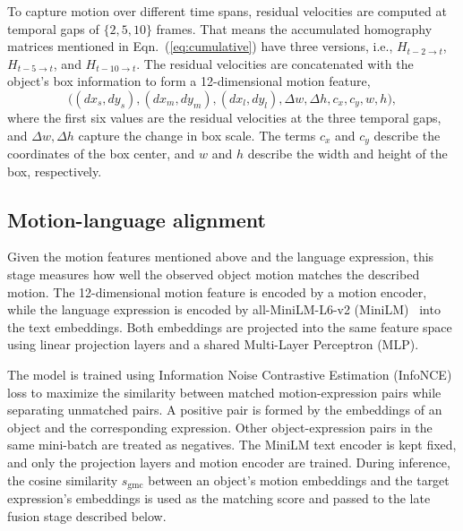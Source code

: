 \documentclass{article}
\begin{document}
To capture motion over different time spans, residual velocities are computed at temporal gaps of $\{2,5,10\}$ frames. That means the accumulated homography matrices mentioned in Eqn.~(\ref{eq:cumulative}) have three versions, i.e., $H_{t-2 \to t}$, $H_{t-5 \to t}$, and $H_{t-10 \to t}$. The residual velocities are concatenated with the object's box information to form a 12-dimensional motion feature,
\begin{equation}
  \bigl((dx_s,dy_s),(dx_m,dy_m),(dx_l,dy_l),\Delta w,\Delta h,c_x,c_y,w,h\bigr),
  \label{eq:descriptor}
\end{equation}
where the first six values are the residual velocities at the three temporal gaps, and $\Delta w, \Delta h$ capture the change in box scale. The terms $c_x$ and $c_y$ describe the coordinates of the box center, and $w$ and $h$ describe the width and height of the box, respectively.

\subsection{Motion-language alignment}
\label{sec:align}
Given the motion features mentioned above and the language expression, this stage measures how well the observed object motion matches the described motion. The 12-dimensional motion feature is encoded by a motion encoder, while the language expression is encoded by all-MiniLM-L6-v2 (MiniLM)~\cite{sbert} into the text embeddings. Both embeddings are projected into the same feature space using linear projection layers and a shared Multi-Layer Perceptron (MLP).

The model is trained using Information Noise Contrastive Estimation (InfoNCE)~\cite{infonce} loss to maximize the similarity between matched motion-expression pairs while separating unmatched pairs. A positive pair is formed by the embeddings of an object and the corresponding expression. Other object-expression pairs in the same mini-batch are treated as negatives. The MiniLM text encoder is kept fixed, and only the projection layers and motion encoder are trained. During inference, the cosine similarity $s_{\mathrm{gmc}}$ between an object's motion embeddings and the target expression's embeddings is used as the matching score and passed to the late fusion stage described below.
\end{document}
